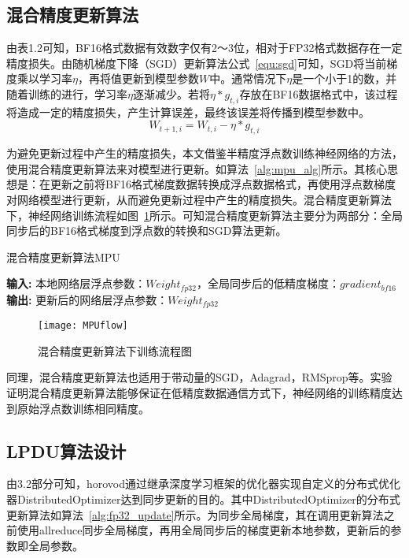 \subsection{混合精度更新算法}
由表1.2可知，BF16格式数据有效数字仅有2～3位，相对于FP32格式数据存在一定精度损失。由随机梯度下降（SGD）更新算法公式~\ref{equ:sgd}可知，SGD将当前梯度乘以学习率$\eta$，再将值更新到模型参数$W$中。通常情况下$\eta$是一个小于1的数，并随着训练的进行，学习率$\eta$逐渐减少。若将$\eta*g_{t,i}$存放在BF16数据格式中，该过程将造成一定的精度损失，产生计算误差，最终该误差将传播到模型参数中。
\begin{equation}
\label{equ:sgd}
W_{t+1,i}=W_{t,i}-\eta*g_{t,i}
\end{equation}

为避免更新过程中产生的精度损失，本文借鉴半精度浮点数训练神经网络的方法，使用混合精度更新算法来对模型进行更新。如算法~\ref{alg:mpu_alg}所示。其核心思想是：在更新之前将BF16格式梯度数据转换成浮点数据格式，再使用浮点数梯度对网络模型进行更新，从而避免更新过程中产生的精度损失。混合精度更新算法下，神经网络训练流程如图~\ref{fig:MPUflow}所示。可知混合精度更新算法主要分为两部分：全局同步后的BF16格式梯度到浮点数的转换和SGD算法更新。

\begin{algorithm}\small
\caption{混合精度更新算法MPU}
\textbf{输入:}
本地网络层浮点参数：$Weight_{fp32}$，全局同步后的低精度梯度：$gradient_{bf16}$ \\
\textbf{输出:} 
更新后的网络层浮点参数：$Weight_{fp32}$
\begin{algorithmic}[1]
\end{algorithmic}
	\label{alg:mpu_alg}
\end{algorithm}

\begin{figure}[htp]
\centering
\texttt{[image: MPUflow]}
\caption{混合精度更新算法下训练流程图}
\label{fig:MPUflow}
\end{figure}


同理，混合精度更新算法也适用于带动量的SGD，Adagrad，RMSprop等。实验证明混合精度更新算法能够保证在低精度数据通信方式下，神经网络的训练精度达到原始浮点数训练相同精度。

\subsection{LPDU算法设计}
由3.2部分可知，horovod通过继承深度学习框架的优化器实现自定义的分布式优化器DistributedOptimizer达到同步更新的目的。其中DistributedOptimizer的分布式更新算法如算法~\ref{alg:fp32_update}所示。为同步全局梯度，其在调用更新算法之前使用allreduce同步全局梯度，再用全局同步后的梯度更新本地参数，更新后的参数即全局参数。

